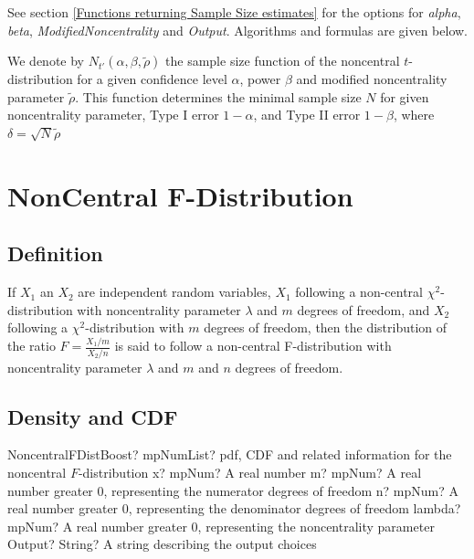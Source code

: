 \vspace{0.3cm}
See section \ref{Functions returning Sample Size estimates} for the options for  {\itshape\sffamily alpha}, {\itshape\sffamily beta}, {\itshape\sffamily ModifiedNoncentrality} and {\itshape\sffamily Output}. Algorithms and formulas are given below.

\vspace{0.3cm}
We denote by $N_{t'}\left(\alpha, \beta, \widetilde{\rho} \right)$  the sample size function of the noncentral $t$-distribution for a given confidence level $\alpha$, power $\beta$ and modified noncentrality parameter $\widetilde{\rho}$. This function determines the minimal sample size $N$ for given noncentrality parameter, Type I error $1-\alpha$, and Type II error $1-\beta$, where  $\delta = \sqrt{N}\widetilde{\rho}$ 







\newpage
\section{NonCentral F-Distribution}
\label{NonCentralFDistributionBoost}

\subsection{Definition}
\label{NonCentralFDistributionDefinitionBoost}

If $X_1$ an $X_2$ are independent random variables, $X_1$  following a non-central $\chi^2$-distribution with noncentrality parameter $\lambda$ and $m$ degrees of freedom, and  
$X_2$  following a $\chi^2$-distribution with $m$ degrees of freedom, then the distribution of the ratio $F=\frac{X_1/m}{X_2/n}$ is said to follow a non-central
F-distribution with  noncentrality parameter $\lambda$ and  $m$ and $n$  degrees of freedom.


\subsection{Density and CDF}

\begin{mpFunctionsExtract}
	\mpFunctionFiveNotImplemented
	{NoncentralFDistBoost? mpNumList? pdf, CDF and related information for the noncentral $F$-distribution}
	{x? mpNum? A real number}
	{m? mpNum? A real number greater 0, representing the numerator  degrees of freedom}
	{n? mpNum? A real number greater 0, representing the denominator degrees of freedom}
	{lambda? mpNum? A real number greater 0, representing the noncentrality parameter}
	{Output? String? A string describing the output choices}
\end{mpFunctionsExtract}




